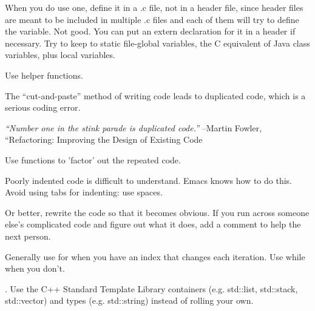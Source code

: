 \documentclass{book}
\begin{document}
%
When you do use one, define it in a .c file, not in a header file,
since header files are meant to be included in multiple .c files and
each of them will try to define the variable.  Not good.  You can put
an extern declaration for it in a header if necessary.  Try to keep to
static file-global variables, the C equivalent of Java class
variables, plus local variables.

%
Use helper functions.

%

The ``cut-and-paste'' method of writing code leads to duplicated code,
which is a serious coding error.  

\textit{``Number one in the stink parade is duplicated code.''}  --Martin Fowler, ``Refactoring: Improving the Design of Existing Code




Use functions to 'factor' out the repeated code.

%
Poorly indented code is difficult to understand.  Emacs knows how to
do this.  Avoid using tabs for indenting: use spaces.


%
  Or better, rewrite the code so that it becomes obvious.  If you run
  across someone else's complicated code and figure out what it does,
  add a comment to help the next person.

%
  Generally use for when you have an index that changes each
  iteration.  Use while when you don't.



.  Use the C++ Standard Template Library
containers (e.g. std::list, std::stack, std::vector) and types
(e.g. std::string) instead of rolling your own.
\end{document}
